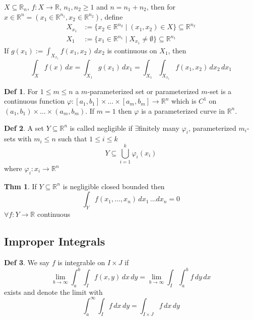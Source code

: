 \documentclass[a4paper, 10pt]{article}
\theoremstyle{definition}
\newtheorem*{theorem}{Thm}
\newtheorem*{definition}{Def}
\newcommand{\R}{\mathbb{R}}
\begin{document}
\begin{ntheorem*}
    \(X \subseteq \R_n\), \(f: X \to \R\), \(n_1, n_2 \geq 1\) and \(n = n_1 + n_2\), then for \(x \in \R^n = (x_1 \in \R^{n_1}, x_2 \in \R^{n_2})\), define
    \begin{align*}
        X_{x_1} &:= \{x_2 \in \R^{n_2} \mid (x_1, x_2) \in X\} \subseteq \R^{n_2} \\
        X_1 &:= \{x_1 \in \R^{n_1} \mid X_{x_1} \neq \emptyset\} \subseteq \R^{n_1}
    \end{align*}
    If \(g(x_1):= \int_{X_{x_1}} f(x_1, x_2) \, dx_2\) is continuous on \(X_1\), then
    \[\int_X f(x) \, dx = \int_{X_1} g(x_1) \, dx_1 = \int_{X_1}\int_{X_{x_1}} f(x_1, x_2) \, dx_2 \, dx_1\]
\end{ntheorem*}

\begin{definition}
    For \(1 \leq m \leq n\) a \(m\)-parameterized set or parameterized \(m\)-set is a continuous function \(\varphi: [a_1, b_1] \times \ldots \times [a_m, b_m] \to \R^n\) which is \(C^1\) on \((a_1, b_1) \times \ldots \times (a_m, b_m)\).
    If \(m = 1\) then \(\varphi\) is a parameterized curve in \(\R^n\).
\end{definition}

\begin{definition}
    A set \(Y \subseteq \R^n\) is called negligible if \(\exists\)finitely many \(\varphi_i\), parameterized \(m_i\)-sets with \(m_i \leq n\) such that \(1 \leq i \leq k\)
    \[Y \subseteq \bigcup_{i = 1}^k \varphi_i(x_i)\]
    where \(\varphi_i: x_i \to \R^n\)
\end{definition}

\begin{theorem}
    If \(Y \subseteq \R^n\) is negligible closed bounded then
    \[\int_Y f(x_1, \ldots, x_n) \, dx_1 \, \ldots dx_n = 0\]
    \(\forall f: Y \to \R\) continuous
\end{theorem}

\subsection{Improper Integrals}
\begin{definition}
    We say \(f\) is integrable on \(I \times J\) if
    \[\lim_{b \to \infty} \int_a^b \int_I f(x, y) \,dx \,dy = \lim_{b \to \infty} \int_I \int_a^b f \, dy \, dx\]
    exists and denote the limit with
    \[\int_a^\infty \int_I f \,dx \,dy = \int_{I \times J} f \,dx \,dy\]
\end{definition}
\end{document}
